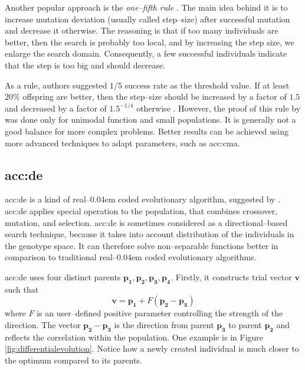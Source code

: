 Another popular approach is the \emph{one--fifth rule} \citep{onefifthrule}. The main idea behind it is to increase mutation deviation (usually called step--size) after successful mutation and decrease it otherwise. The reasoning is that if too many individuals are better, then the search is probably too local, and by increasing the step size, we enlarge the search domain. Consequently, a few successful individuals indicate that the step is too big and should decrease.

As a rule, authors \citet*{onefifthruleoriginal} suggested $1/5$ success rate as the threshold value. If at least $20\%$ offspring are better, then the step--size should be increased by a factor of $1.5$ and decreased by a factor of $1.5^{-1/4}$ otherwise \citep{onefifthrule}. However, the proof of this rule by \citeauthor*{onefifthruleoriginal} was done only for unimodal function and small populations. It is generally not a good balance for more complex problems. Better results can be achieved using more advanced techniques to adapt parameters, such as \acrshort{acc:cma}.

\subsection{\texorpdfstring{\acrlong*{acc:de}}{Differential Evolution}}

\acrfull{acc:de} is a kind of real--\kern0.04em coded evolutionary algorithm, suggested by \citet*{differentialevolutionoriginal}. \acrshort{acc:de} applies special operation to the population, that combines crossover, mutation, and selection. \acrshort{acc:de} is sometimes considered as a directional--based search technique, because it takes into account distribution of the individuals in the genotype space. It can therefore solve non--separable func\-tions better in comparison to traditional real--\kern0.04em coded evolutionary algorithms.

\acrshort{acc:de} uses four distinct parents $\mathbf{p_1}, \mathbf{p_2}, \mathbf{p_3}, \mathbf{p_4}$. Firstly, it constructs trial vector $\mathbf{v}$ such that
$$
\mathbf{v} = \mathbf{p_1} + F\left( \mathbf{p_2} - \mathbf{p_3} \right)
$$
where $F$ is an user--defined positive parameter controlling the strength of the direction. The vector $\mathbf{p_2} - \mathbf{p_3}$ is the direction from parent $\mathbf{p_3}$ to parent $\mathbf{p_2}$ and reflects the correlation within the population. One example is in Figure \ref{fig:differentialevolution}. Notice how a newly created individual is much closer to the optimum compared to its parents.


